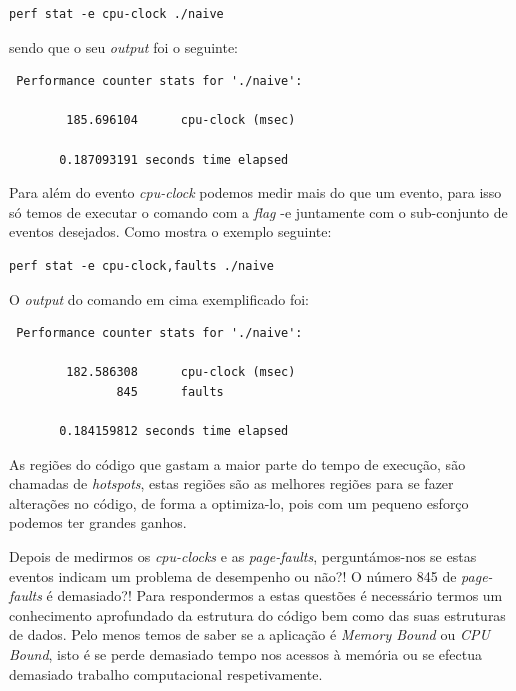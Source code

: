 \documentclass[conference,compsoc]{IEEEtran}
\begin{document}
\begin{lstlisting}
perf stat -e cpu-clock ./naive
\end{lstlisting} 

sendo que o seu \textit{output} foi o seguinte:

\begin{lstlisting}
 Performance counter stats for './naive':

        185.696104      cpu-clock (msec)                                            

       0.187093191 seconds time elapsed
\end{lstlisting} 

Para além do evento \textit{cpu-clock} podemos medir mais do que um evento, para isso só temos de executar o comando com a \textit{flag} -e juntamente com o sub-conjunto de eventos desejados. Como mostra o exemplo seguinte:


\begin{lstlisting}
perf stat -e cpu-clock,faults ./naive
\end{lstlisting}

O \textit{output} do comando em cima exemplificado foi:

\begin{lstlisting}
 Performance counter stats for './naive':

        182.586308      cpu-clock (msec)                                            
               845      faults                                                      

       0.184159812 seconds time elapsed
\end{lstlisting}

As regiões do código que gastam a maior parte do tempo de execução, são chamadas de \textit{hotspots}, estas regiões são as melhores regiões para se fazer alterações no código, de forma a optimiza-lo, pois com um pequeno esforço podemos ter grandes ganhos.

Depois de medirmos os \textit{cpu-clocks} e as \textit{page-faults}, perguntámos-nos se estas eventos indicam um problema de desempenho ou não?! O número 845 de \textit{page-faults} é demasiado?! Para respondermos a estas questões é necessário termos um conhecimento aprofundado da estrutura do código bem como das suas estruturas de dados. Pelo menos temos de saber se a aplicação é \textit{Memory Bound} ou  \textit{CPU Bound}, isto é se perde demasiado tempo nos acessos à memória ou se efectua demasiado trabalho computacional respetivamente. 
\end{document}
